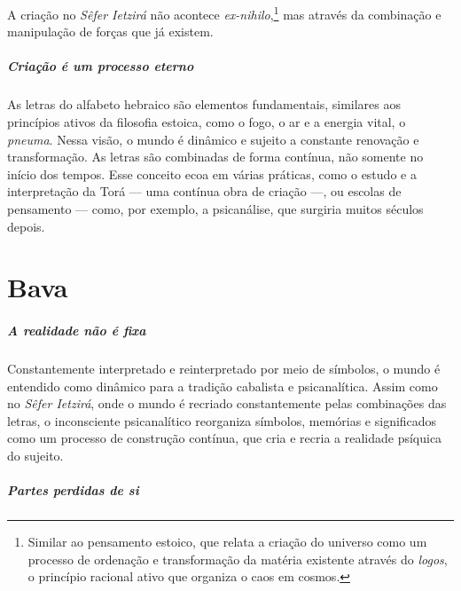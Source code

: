 A criação no \textit{Sêfer Ietzirá} não acontece \textit{ex-nihilo},\footnote{Similar ao pensamento estoico, que relata a criação do universo como um processo de ordenação e transformação da matéria existente através do \textit{logos}, o princípio racional ativo que organiza o caos em cosmos.} mas através da combinação e manipulação de forças que já existem.

\paragraph{Criação é um processo eterno} As letras do alfabeto hebraico são elementos fundamentais, similares aos princípios ativos da filosofia estoica, como o fogo, o ar e a energia vital, o \textit{pneuma}. Nessa visão, o mundo é dinâmico e sujeito a constante renovação e transformação. As letras são combinadas de forma contínua, não somente no início dos tempos. Esse conceito ecoa em várias práticas, como o estudo e a interpretação da Torá --- uma contínua obra de criação ---, ou escolas de pensamento --- como, por exemplo, a psicanálise, que surgiria muitos séculos depois.

\chapter*{Bava \smallskip{}}

\begin{center}
{\huge{}}
\end{center}

\paragraph{A realidade não é fixa} Constantemente interpretado e reinterpretado por meio de símbolos, o mundo é entendido como dinâmico para a tradição cabalista e psicanalítica. Assim como no \textit{Sêfer Ietzirá}, onde o mundo é recriado constantemente pelas combinações das letras, o inconsciente psicanalítico reorganiza símbolos, memórias e significados como um processo de construção contínua, que cria e recria a realidade psíquica do sujeito. 

\paragraph{Partes perdidas de si} 

